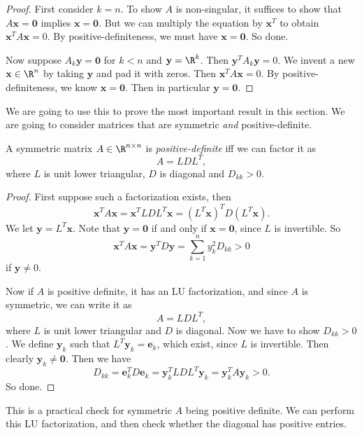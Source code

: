 \documentclass[a4paper]{article}
\begin{document}
\begin{proof}
  First consider $k = n$. To show $A$ is non-singular, it suffices to show that $A\mathbf{x} = \mathbf{0}$ implies $\mathbf{x} = \mathbf{0}$. But we can multiply the equation by $\mathbf{x}^T$ to obtain $\mathbf{x}^T A\mathbf{x} = 0$. By positive-definiteness, we must have $\mathbf{x} = \mathbf{0}$. So done.

  Now suppose $A_k \mathbf{y} = \mathbf{0}$ for $k < n$ and $\mathbf{y} = \R^k$. Then $\mathbf{y}^T A_k \mathbf{y} = 0$. We invent a new $\mathbf{x} \in \R^n$ by taking $\mathbf{y}$ and pad it with zeros. Then $\mathbf{x}^T A\mathbf{x} = 0$. By positive-definiteness, we know $\mathbf{x} = \mathbf{0}$. Then in particular $\mathbf{y} = \mathbf{0}$.
\end{proof}

We are going to use this to prove the most important result in this section. We are going to consider matrices that are symmetric \emph{and} positive-definite.

\begin{thm}
  A symmetric matrix $A \in \R^{n \times n}$ is \emph{positive-definite} iff we can factor it as
  \[
    A = LDL^T,
  \]
  where $L$ is unit lower triangular, $D$ is diagonal and $D_{kk} > 0$.
\end{thm}

\begin{proof}
  First suppose such a factorization exists, then
  \[
    \mathbf{x}^T A\mathbf{x} = \mathbf{x}^T L DL^T \mathbf{x} = (L^T\mathbf{x})^T D(L^T\mathbf{x}).
  \]
  We let $\mathbf{y} = L^T\mathbf{x}$. Note that $\mathbf{y} = \mathbf{0}$ if and only if $\mathbf{x} = \mathbf{0}$, since $L$ is invertible. So
  \[
    \mathbf{x}^TA\mathbf{x} = \mathbf{y}^T D\mathbf{y} = \sum_{k = 1}^n y_k^2 D_{kk} > 0
  \]
  if $\mathbf{y} \not= 0$.

  Now if $A$ is positive definite, it has an LU factorization, and since $A$ is symmetric, we can write it as
  \[
    A = LDL^T,
  \]
  where $L$ is unit lower triangular and $D$ is diagonal. Now we have to show $D_{kk} > 0$. We define $\mathbf{y}_k$ such that $L^T \mathbf{y}_k = \mathbf{e}_k$, which exist, since $L$ is invertible. Then clearly $\mathbf{y}_k \not= \mathbf{0}$. Then we have
  \[
    D_{kk} = \mathbf{e}_k^T D\mathbf{e}_k = \mathbf{y}_k^T LDL^T \mathbf{y}_k = \mathbf{y}_k^T A\mathbf{y}_k > 0.
  \]
  So done.
\end{proof}
This is a practical check for symmetric $A$ being positive definite. We can perform this LU factorization, and then check whether the diagonal has positive entries.
\end{document}
